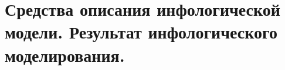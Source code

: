 {
	\section{Средства описания инфологической модели. Результат инфологического моделирования.}
	\newpage
}
